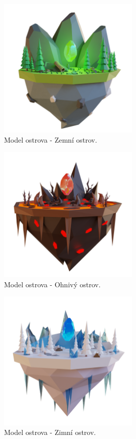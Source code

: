 \begin{figure}[h]
    \centering
    \includegraphics[width=0.6\textwidth]{img/NatureIsland.png}
    \caption{Model ostrova - Zemní ostrov.}
    \label{fig:nature-island}
\end{figure}

\begin{figure}[h]
    \centering
    \includegraphics[width=0.6\textwidth]{img/FireIsland.png}
    \caption{Model ostrova - Ohnivý ostrov.}
    \label{fig:fire-island}
\end{figure}

\begin{figure}[h]
    \centering
    \includegraphics[width=0.6\textwidth]{img/WinterIsland.png}
    \caption{Model ostrova - Zimní ostrov.}
    \label{fig:winter-island}
\end{figure}

